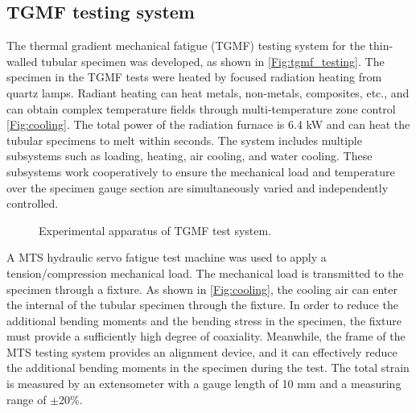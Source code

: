 \documentclass[preprint,5p,twocolumn,10pt,sort&compress]{elsarticle}
\begin{document}
\subsection{TGMF testing system}
The thermal gradient mechanical fatigue (TGMF) testing system for the thin-walled tubular specimen was developed, as shown in \autoref{Fig:tgmf_testing}. The specimen in the TGMF tests were heated by focused radiation heating from quartz lamps. Radiant heating can heat metals, non-metals, composites, etc., and can obtain complex temperature fields through multi-temperature zone control \autoref{Fig:cooling}. The total power of the radiation furnace is 6.4 kW and can heat the tubular specimens to melt within seconds.
The system includes multiple subsystems such as loading, heating, air cooling, and water cooling. These subsystems work cooperatively to ensure the mechanical load and temperature over the specimen gauge section are simultaneously varied and independently controlled. 
\begin{figure}[!ht]
\caption{Experimental apparatus of TGMF test system.}
\label{Fig:tgmf_testing}
\end{figure}

A MTS hydraulic servo fatigue test machine was used to apply a tension/compression mechanical load. The mechanical load is transmitted to the specimen through a fixture. As shown in \autoref{Fig:cooling}, the cooling air can enter the internal of the tubular specimen through the fixture. In order to reduce the additional bending moments and the bending stress in the specimen, the fixture must provide a sufficiently high degree of coaxiality. Meanwhile, the frame of the MTS testing system provides an alignment device, and it can effectively reduce the additional bending moments in the specimen during the test. The total strain is measured by an extensometer with a gauge length of 10 mm and a measuring range of $\pm$20\%. 
\end{document}
